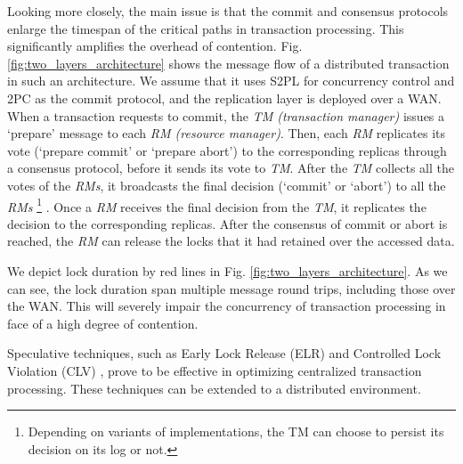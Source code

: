 \documentclass[conference]{IEEEtran}
\begin{document}
Looking more closely, the main issue is that the commit and consensus protocols enlarge the timespan of the critical paths in transaction processing.
This significantly amplifies the overhead of contention.
Fig.    \ref{fig:two_layers_architecture} shows the message flow of a distributed transaction in such an architecture. We assume that
it uses S2PL for concurrency control and 2PC as the commit protocol, and the replication layer is deployed over a WAN.
When a transaction requests to commit, the \emph{TM (transaction manager)} issues a `prepare' message to each \emph{RM (resource manager)}.
Then, each \emph{RM} replicates its vote (`prepare commit' or `prepare abort') to the corresponding replicas through a consensus protocol, before it
sends its vote to \emph{TM}.
After the \emph{TM} collects all the votes of the \emph{RMs},
it broadcasts the final decision (`commit' or `abort') to all the \emph{RMs}
\footnote{Depending on variants of implementations, the TM can choose to persist its decision on its log or not.}
.
Once a \emph{RM} receives the final decision from the \emph{TM}, it replicates the decision to the corresponding replicas.
After the consensus of commit or abort is reached, the \emph{RM}
can release the locks that it had retained over the accessed data.

We depict lock duration by red lines in Fig.    \ref{fig:two_layers_architecture}.
As we can see, the lock duration span multiple message round trips, including those over the WAN.
This will severely impair the concurrency of transaction processing in face of a high degree of contention.

Speculative techniques, such as Early Lock Release (ELR) \cite{EfficientLocking:conf/vldb/KimuraGK12} and Controlled Lock Violation (CLV)
\cite{CLV:conf/sigmod/GraefeLKTV13}, prove to be effective in optimizing centralized transaction processing.
These techniques can be extended to a distributed environment.
\end{document}
